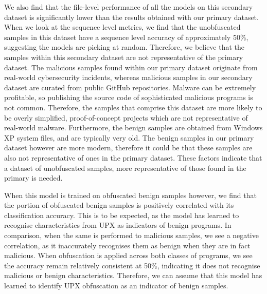 \documentclass[conference,compsoc]{IEEEtran}
\begin{document}
We also find that the file-level performance of all the models on this secondary dataset is significantly lower than the results obtained with our primary dataset. When we look at the sequence level metrics, we find that the unobfuscated samples in this dataset have a sequence level accuracy of approximately 50\%, suggesting the models are picking at random. Therefore, we believe that the samples within this secondary dataset are not representative of the primary dataset. The malicious samples found within our primary dataset originate from real-world cybersecurity incidents, whereas malicious samples in our secondary dataset are curated from public GitHub repositories. Malware can be extremely profitable, so publishing the source code of sophisticated malicious programs is not common. Therefore, the samples that comprise this dataset are more likely to be overly simplified, proof-of-concept projects which are not representative of real-world malware. Furthermore, the benign samples are obtained from Windows XP system files, and are typically very old. The benign samples in our primary dataset however are more modern, therefore it could be that these samples are also not representative of ones in the primary dataset. These factors indicate that a dataset of unobfuscated samples, more representative of those found in the primary is needed. 

When this model is trained on obfuscated benign samples however, we find that the portion of obfuscated benign samples is positively correlated with its classification accuracy. This is to be expected, as the model has learned to recognise characteristics from UPX as indicators of benign programs. In comparison, when the same is performed to malicious samples, we see a negative correlation, as it inaccurately recognises them as benign when they are in fact malicious. When obfuscation is applied across both classes of programs, we see the accuracy remain relatively consistent at 50\%, indicating it does not recognise malicious or benign characteristics. Therefore, we can assume that this model has learned to identify UPX obfuscation as an indicator of benign samples. 
\end{document}

